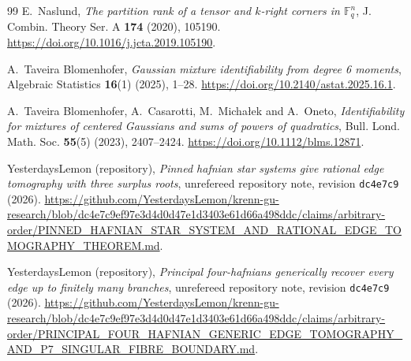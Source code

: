 \documentclass[11pt]{article}
\theoremstyle{remark}\newtheorem{remark}[theorem]{Remark}
\begin{document}
\begin{thebibliography}{99}
E.~Naslund,
\emph{The partition rank of a tensor and $k$-right corners in $\mathbb F_q^n$},
J. Combin. Theory Ser. A \textbf{174} (2020), 105190.
\url{https://doi.org/10.1016/j.jcta.2019.105190}.

A.~Taveira Blomenhofer,
\emph{Gaussian mixture identifiability from degree 6 moments},
Algebraic Statistics \textbf{16}(1) (2025), 1--28.
\url{https://doi.org/10.2140/astat.2025.16.1}.

A.~Taveira Blomenhofer, A.~Casarotti, M.~Micha\l ek and A.~Oneto,
\emph{Identifiability for mixtures of centered Gaussians and sums of powers
of quadratics}, Bull. Lond. Math. Soc. \textbf{55}(5) (2023), 2407--2424.
\url{https://doi.org/10.1112/blms.12871}.

YesterdaysLemon (repository),
\emph{Pinned hafnian star systems give rational edge tomography with three surplus roots},
unrefereed repository note, revision \texttt{dc4e7c9} (2026).
\url{https://github.com/YesterdaysLemon/krenn-gu-research/blob/dc4e7c9ef97e3d4d0d47e1d3403e61d66a498ddc/claims/arbitrary-order/PINNED_HAFNIAN_STAR_SYSTEM_AND_RATIONAL_EDGE_TOMOGRAPHY_THEOREM.md}.

YesterdaysLemon (repository),
\emph{Principal four-hafnians generically recover every edge up to finitely many branches},
unrefereed repository note, revision \texttt{dc4e7c9} (2026).
\url{https://github.com/YesterdaysLemon/krenn-gu-research/blob/dc4e7c9ef97e3d4d0d47e1d3403e61d66a498ddc/claims/arbitrary-order/PRINCIPAL_FOUR_HAFNIAN_GENERIC_EDGE_TOMOGRAPHY_AND_P7_SINGULAR_FIBRE_BOUNDARY.md}.

\end{thebibliography}
\end{document}
